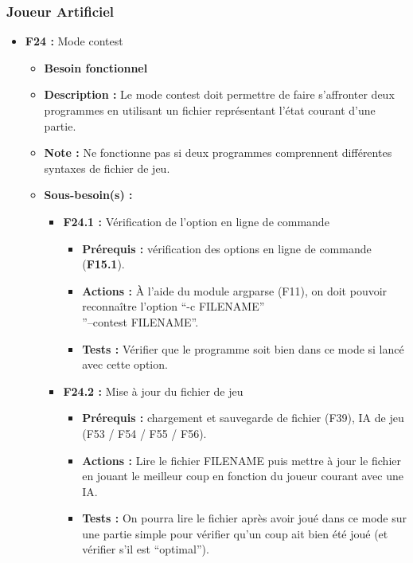 \documentclass{article}
\begin{document}
\subsubsection{Joueur Artificiel}
\medskip
\begin{itemize}
    \item \textbf{F24 :} Mode contest
    \begin{itemize}
        \item \textbf{Besoin fonctionnel}
        \item \textbf{Description :} Le mode contest doit permettre de faire s’affronter deux programmes en utilisant un fichier représentant l’état courant d’une partie.
        \item \textbf{Note :} Ne fonctionne pas si deux programmes comprennent différentes syntaxes de fichier de jeu.
        \item \textbf{Sous-besoin(s) :}
        \begin{itemize}
            \smallskip
            \item \textbf{F24.1 :} Vérification de l’option en ligne de commande
            \begin{itemize}
                \item \textbf{Prérequis :} vérification des options en ligne de commande (\textbf{F15.1}).
                \item \textbf{Actions :} À l’aide du module argparse (F11), on doit pouvoir reconnaître l’option “-c FILENAME”\\”--contest FILENAME”.
                \item \textbf{Tests :} Vérifier que le programme soit bien dans ce mode si lancé avec cette option.
            \end{itemize}
            \smallskip
            \item \textbf{F24.2 :} Mise à jour du fichier de jeu
            \begin{itemize}
                \item \textbf{Prérequis :} chargement et sauvegarde de fichier (F39), IA de jeu (F53 / F54 / F55 / F56).
                \item \textbf{Actions :} Lire le fichier FILENAME puis mettre à jour le fichier en jouant le meilleur coup en fonction du joueur courant avec une IA.
                \item \textbf{Tests :} On pourra lire le fichier après avoir joué dans ce mode sur une partie simple pour vérifier qu’un coup ait bien été joué (et vérifier s’il est “optimal”).

\end{itemize}
\end{itemize}
\end{itemize}
\end{itemize}
\end{document}
